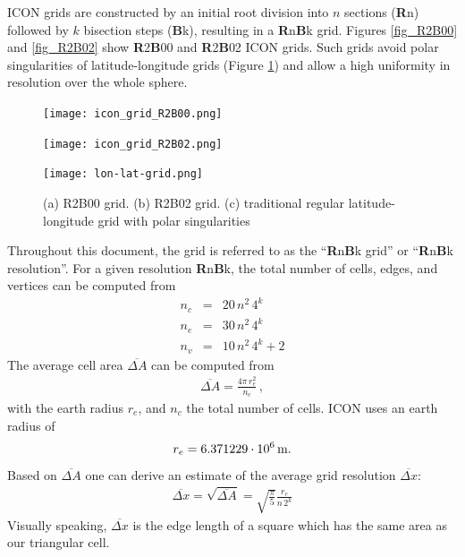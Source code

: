 ICON grids are constructed by an initial root division into $n$ sections (\textbf{R}n) followed by $k$ bisection steps (\textbf{B}k), 
resulting in a \textbf{R}n\textbf{B}k grid. Figures \ref{fig_R2B00} and \ref{fig_R2B02} show \textbf{R}2\textbf{B}00 and 
\textbf{R}2\textbf{B}02 ICON grids. Such grids avoid polar singularities of latitude-longitude grids (Figure \ref{fig_lonlat}) 
and allow a high uniformity in resolution over the whole sphere.

\begin{figure}[h]
  \begin{minipage}[b]{0.3\textwidth}
    \centering
    \texttt{[image: icon\_grid\_R2B00.png]}
    \subcaption{}\label{fig_R2B00}
  \end{minipage}\hfill
  \begin{minipage}[b]{0.3\textwidth}
    \centering
    \texttt{[image: icon\_grid\_R2B02.png]}
    \subcaption{}\label{fig_R2B02}
  \end{minipage}\hfill
  \begin{minipage}[b]{0.3\textwidth}
    \centering
    \texttt{[image: lon-lat-grid.png]}
    \subcaption{}\label{fig_lonlat}
  \end{minipage}\hfill
  \caption{(a) R2B00 grid. (b) R2B02 grid. (c) traditional regular latitude-longitude grid with polar singularities}
\end{figure}

Throughout this document, the grid is referred to as the ``\textbf{R}n\textbf{B}k grid'' or ``\textbf{R}n\textbf{B}k resolution''. For a given resolution \textbf{R}n\textbf{B}k, 
the total number of cells, edges, and vertices can be computed from
\begin{eqnarray*}
 n_{c} &=& 20\,n^{2}\,4^{k} \\
 n_{e} &=& 30\,n^{2}\,4^{k} \\
 n_{v} &=& 10\,n^{2}\,4^{k} + 2
\end{eqnarray*}
The average cell area $\overline{\Delta A}$ can be computed from
\begin{align*}
 \overline{\Delta A} = \frac{4\pi\,r_{e}^{2}}{n_{c}}\,,
\end{align*}
with the earth radius $r_{e}$, and $n_{c}$ the total number of cells. 
%
ICON uses an earth radius of
\begin{align*}
 r_{e} =  6.371229 \cdot 10^6 \, \text{m}.
\end{align*}
%
Based on $\overline{\Delta A}$ one can derive an estimate of the average grid resolution 
$\overline{\Delta x}$:
\begin{align*}
 \overline{\Delta x} = \sqrt{\overline{\Delta A}} = \sqrt{\frac{\pi}{5}} \frac{r_{e}}{n\,2^{k}}
\end{align*}
Visually speaking, $\overline{\Delta x}$ is the edge length of a square which has the same area as our triangular cell.


